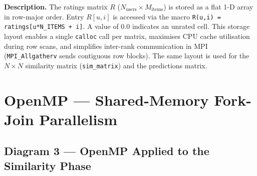\documentclass[12pt,a4paper]{article}
\begin{document}
\begin{mdframed}[style=descbox]
\textbf{Description.} The ratings matrix $R$ ($N_{\text{users}} \times
M_{\text{items}}$) is stored as a flat 1-D array in row-major order.
Entry $R[u,i]$ is accessed via the macro \texttt{R(u,i) = ratings[u*N\_ITEMS + i]}.
A value of $0.0$ indicates an unrated cell.  This storage layout enables a
single \texttt{calloc} call per matrix, maximises CPU cache utilisation during
row scans, and simplifies inter-rank communication in MPI
(\texttt{MPI\_Allgatherv} sends contiguous row blocks).
The same layout is used for the $N \times N$ similarity matrix
(\texttt{sim\_matrix}) and the predictions matrix.
\end{mdframed}

\newpage

\section{OpenMP — Shared-Memory Fork-Join Parallelism}

\subsection*{Diagram 3 — OpenMP Applied to the Similarity Phase}
\end{document}
